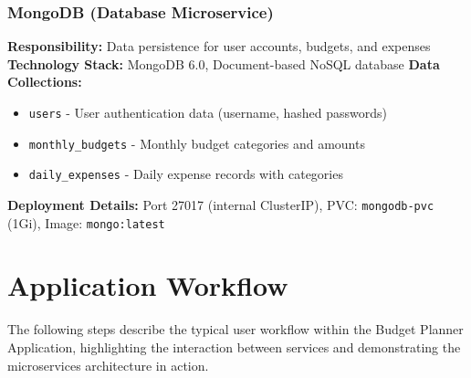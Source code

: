 \documentclass[conference]{IEEEtran}
\begin{document}
\subsubsection{MongoDB (Database Microservice)}
\textbf{Responsibility:} Data persistence for user accounts, budgets, and expenses
\textbf{Technology Stack:} MongoDB 6.0, Document-based NoSQL database
\textbf{Data Collections:}
\begin{itemize}
  \item \texttt{users} - User authentication data (username, hashed passwords)
  \item \texttt{monthly\_budgets} - Monthly budget categories and amounts
  \item \texttt{daily\_expenses} - Daily expense records with categories
\end{itemize}
\textbf{Deployment Details:} Port 27017 (internal ClusterIP), PVC: \texttt{mongodb-pvc} (1Gi), Image: \texttt{mongo:latest}

\section{\textbf{Application Workflow}}
The following steps describe the typical user workflow within the Budget Planner Application, highlighting the interaction between services and demonstrating the microservices architecture in action.
\end{document}
